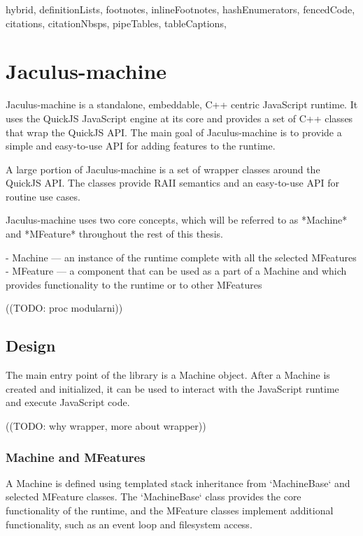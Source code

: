 \begin{markdown*}{%
  hybrid,
  definitionLists,
  footnotes,
  inlineFootnotes,
  hashEnumerators,
  fencedCode,
  citations,
  citationNbsps,
  pipeTables,
  tableCaptions,
}

\chapter{Jaculus-machine} \label{chap:machine}

Jaculus-machine is a standalone, embeddable, C++ centric JavaScript runtime. It uses the QuickJS JavaScript engine at its core and provides a set of C++ classes that wrap the QuickJS API. The main goal of Jaculus-machine is to provide a simple and easy-to-use API for adding features to the runtime.

A large portion of Jaculus-machine is a set of wrapper classes around the QuickJS API. The classes provide RAII semantics and an easy-to-use API for routine use cases.

Jaculus-machine uses two core concepts, which will be referred to as *Machine* and *MFeature* throughout the rest of this thesis.

  - Machine --- an instance of the runtime complete with all the selected MFeatures
  - MFeature --- a component that can be used as a part of a Machine and which provides functionality to the runtime or to other MFeatures

((TODO: proc modularni))

\section{Design}

The main entry point of the library is a Machine object. After a Machine is created and initialized, it can be used to interact with the JavaScript runtime and execute JavaScript code.

((TODO: why wrapper, more about wrapper))

\subsection{Machine and MFeatures}

A Machine is defined using templated stack inheritance from `MachineBase` and selected MFeature classes. The `MachineBase` class provides the core functionality of the runtime, and the MFeature classes implement additional functionality, such as an event loop and filesystem access.


\end{markdown*}
